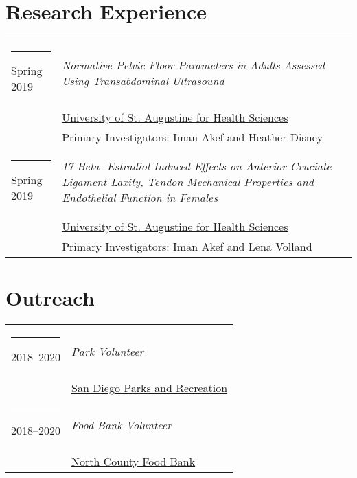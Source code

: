 \documentclass[margin,line]{res}
\begin{document}
\begin{resume}
\section{\sc Research Experience}
\begin{longtable}{@{}p{0.7in}p{4in}}\rule{-1mm}{4.5mm}
\hspace*{-4mm} Spring 2019 & \textit{Normative Pelvic Floor Parameters in Adults Assessed Using Transabdominal Ultrasound}\\*
\hspace*{-4mm} & \hspace{4mm} \href{https://www.usa.edu/}{University of St. Augustine for Health Sciences}\\*
\hspace*{-4mm} & \hspace{4mm} Primary Investigators: Iman Akef and Heather Disney\\
\hspace*{-4mm} \rule{-1mm}{5mm} Spring 2019 & {\textit{17 Beta- Estradiol Induced Effects on Anterior Cruciate Ligament Laxity, Tendon Mechanical Properties and Endothelial Function in Females}}\\*
\hspace*{-4mm} & \hspace{4mm} \href{https://www.usa.edu/}{University of St. Augustine for Health Sciences}\\*
\hspace*{-4mm} & \hspace{4mm} Primary Investigators: Iman Akef and Lena Volland\\
\end{longtable}

\section{\sc Outreach}
\begin{longtable}{@{}p{0.7in}p{4in}}\rule{-1mm}{4.5mm}
\hspace*{-4mm} 2018--2020 & \textit{Park Volunteer}\\*
\hspace*{-4mm} & \hspace{4mm} \href{https://www.sandiego.gov/park-and-recreation}{San Diego Parks and Recreation}\\

\hspace*{-4mm} \rule{-1mm}{5mm} 2018--2020 & \textit{Food Bank Volunteer}\\*
\hspace*{-4mm} & \hspace{4mm} \href{https://northcountyfoodbank.org/}{North County Food Bank}\\


\end{longtable}
\end{resume}
\end{document}
